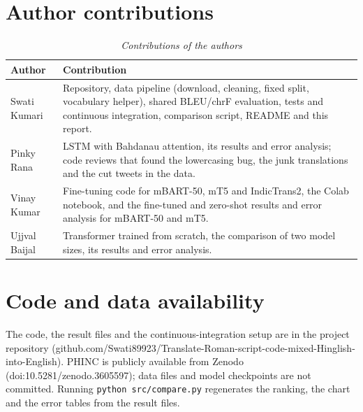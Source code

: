 \documentclass[11pt,a4paper]{article}
\begin{document}
\section*{Author contributions}
\begin{table}[t]
\caption{\textit{Contributions of the authors}}\label{tab:contrib}
\centering
\begin{tabular}{>{\raggedright\arraybackslash\scriptsize}p{}>{\raggedright\arraybackslash\scriptsize}p{}}
\hline\hline
\textbf{Author} & \textbf{Contribution} \\
\hline
Swati Kumari & Repository, data pipeline (download, cleaning, fixed split, vocabulary helper), shared BLEU/chrF evaluation, tests and continuous integration, comparison script, README and this report. \\
Pinky Rana & LSTM with Bahdanau attention, its results and error analysis; code reviews that found the lowercasing bug, the junk translations and the cut tweets in the data. \\
Vinay Kumar & Fine-tuning code for mBART-50, mT5 and IndicTrans2, the Colab notebook, and the fine-tuned and zero-shot results and error analysis for mBART-50 and mT5. \\
Ujjval Baijal & Transformer trained from scratch, the comparison of two model sizes, its results and error analysis. \\
\hline\hline
\end{tabular}
\end{table}
\section*{Code and data availability}
The code, the result files and the continuous-integration setup are in the project repository (github.com/Swati89923/Translate-Roman-script-code-mixed-Hinglish-into-English). PHINC is publicly available from Zenodo (doi:10.5281/zenodo.3605597); data files and model checkpoints are not committed. Running \texttt{python src/compare.py} regenerates the ranking, the chart and the error tables from the result files.
\end{document}
